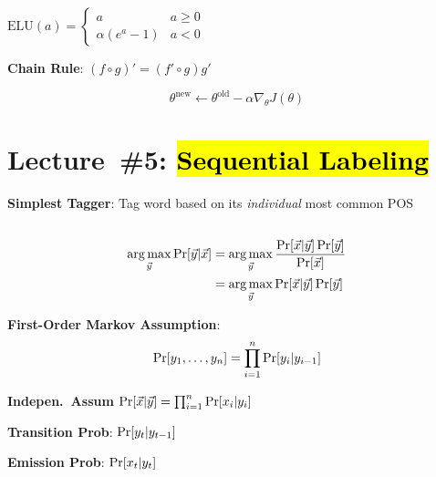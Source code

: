 \documentclass[8pt]{extarticle}
\renewcommand{\green}[1]{{\color{ForestGreen} #1}}
\newcommand{\greenbf}[1]{\textbf{\green{#1}}}
\begin{document}
\begin{multicols}{3}
  $\text{ELU}(a) = \begin{cases}
                      a & a \geq 0 \\
                      \alpha (e^{a} - 1) & a < 0
                   \end{cases}$

  \greenbf{Chain Rule}: $(f \circ g)' = (f' \circ g)g'$

  \begin{equation*}
    \theta^{\text{new}} \gets \theta^{\text{old}} - \alpha \nabla_{\theta}J(\theta)
  \end{equation*}

  \section*{Lecture~\#5: \hl{Sequential Labeling}}

  \textbf{Simplest Tagger}: Tag word based on its \textit{individual} most common POS

  \subsection*{}

  \begin{align*}
    \operatorname*{arg\,max}_{\vec{y}} \Pr\lbrack\vec{y} \vert \vec{x}\rbrack &= \operatorname*{arg\,max}_{\vec{y}} \frac{\Pr\lbrack\vec{x} \vert \vec{y}\rbrack\Pr[\vec{y}]}{\Pr[\vec{x}]} \\
                                                        &= \operatorname*{arg\,max}_{\vec{y}} \Pr\lbrack\vec{x} \vert \vec{y}\rbrack \Pr[\vec{y}]
  \end{align*}

  \greenbf{First-Order Markov Assumption}:
  \begin{equation*}
    \Pr\lbrack y_{1},\ldots,y_{n}\rbrack = \prod_{i=1}^{n} \Pr[y_{i} \vert y_{i-1}]
  \end{equation*}

  \greenbf{Indepen.\ Assum} $\Pr\lbrack\vec{x} \vert \vec{y}\rbrack = \prod_{i=1}^{n} \Pr[x_{i} \vert y_{i}]$

  \greenbf{Transition Prob}: $\Pr\lbrack y_{t} \vert y_{t-1}\rbrack$

  \greenbf{Emission Prob}: $\Pr\lbrack x_{t} \vert y_{t}\rbrack$

  \subsubsection*{}


\end{multicols}
\end{document}
